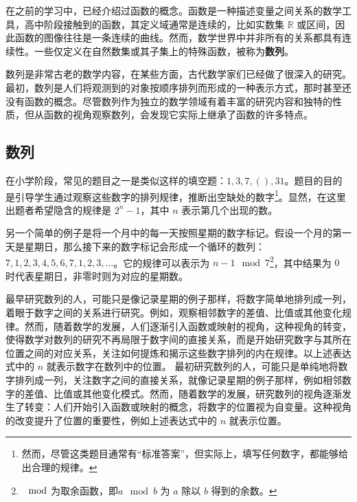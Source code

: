 
\begin{issues}
\issueDraft
\end{issues}

在之前的学习中，已经介绍过函数的概念。函数是一种描述变量之间关系的数学工具，高中阶段接触到的函数，其定义域通常是连续的，比如实数集 $\mathbb{R}$ 或区间，因此函数的图像往往是一条连续的曲线。然而，数学世界中并非所有的关系都具有连续性。一些仅定义在自然数集或其子集上的特殊函数，被称为\textbf{数列}。

数列是非常古老的数学内容，在某些方面，古代数学家们已经做了很深入的研究。最初，数列是人们将观测到的对象按顺序排列而形成的一种表示方式，那时甚至还没有函数的概念。尽管数列作为独立的数学领域有着丰富的研究内容和独特的性质，但从函数的视角观察数列，会发现它实际上继承了函数的许多特点。

\subsection{数列}

在小学阶段，常见的题目之一是类似这样的填空题：$1,3,7,(),31$。题目的目的是引导学生通过观察这些数字的排列规律，推断出空缺处的数字\footnote{然而，尽管这类题目通常有“标准答案”，但实际上，填写任何数字，都能够给出合理的规律。}。显然，在这里出题者希望隐含的规律是 $2^n - 1$，其中 $n$ 表示第几个出现的数。

另一个简单的例子是将一个月中的每一天按照星期的数字标记。假设一个月的第一天是星期日，那么接下来的数字标记会形成一个循环的数列：$7, 1, 2, 3, 4, 5, 6, 7, 1, 2, 3, \dots$。它的规律可以表示为 $n-1 \mod 7$\footnote{$\mod$为取余函数，即$a \mod b$ 为 $a$ 除以 $b$ 得到的余数。}，其中结果为 $0$ 时代表星期日，非零时则为对应的星期数。

最早研究数列的人，可能只是像记录星期的例子那样，将数字简单地排列成一列，着眼于数字之间的关系进行研究。例如，观察相邻数字的差值、比值或其他变化规律。然而，随着数学的发展，人们逐渐引入函数或映射的视角，这种视角的转变，使得数学对数列的研究不再局限于数字间的直接关系，而是开始研究数字与其所在位置之间的对应关系，关注如何提炼和揭示这些数字排列的内在规律。以上述表达式中的 $n$ 就表示数字在数列中的位置。
最初研究数列的人，可能只是单纯地将数字排列成一列，关注数字之间的直接关系，就像记录星期的例子那样，例如相邻数字的差值、比值或其他变化模式。然而，随着数学的发展，研究数列的视角逐渐发生了转变：人们开始引入函数或映射的概念，将数字的位置视为自变量。这种视角的改变提升了位置的重要性，例如上述表达式中的 $n$ 就表示位置。

